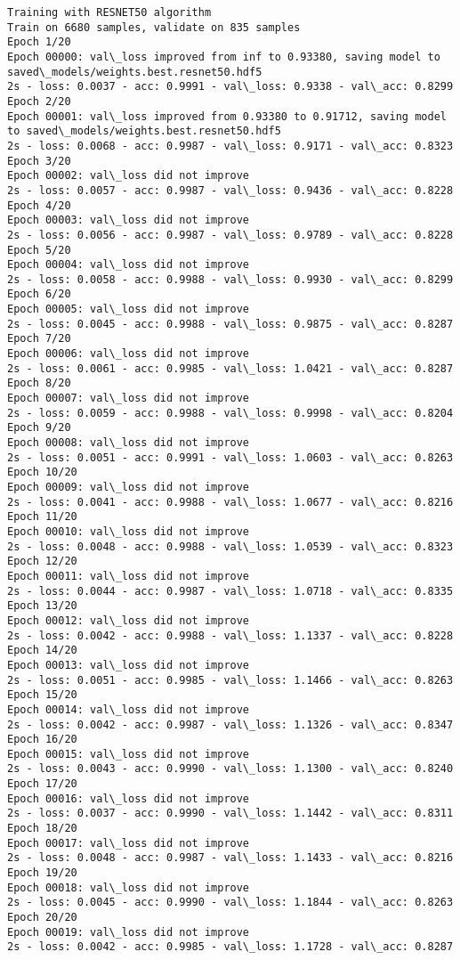 \documentclass[11pt]{article}
\begin{document}
\begin{Verbatim}[commandchars=\\\{\}]
Training with RESNET50 algorithm
Train on 6680 samples, validate on 835 samples
Epoch 1/20
Epoch 00000: val\_loss improved from inf to 0.93380, saving model to saved\_models/weights.best.resnet50.hdf5
2s - loss: 0.0037 - acc: 0.9991 - val\_loss: 0.9338 - val\_acc: 0.8299
Epoch 2/20
Epoch 00001: val\_loss improved from 0.93380 to 0.91712, saving model to saved\_models/weights.best.resnet50.hdf5
2s - loss: 0.0068 - acc: 0.9987 - val\_loss: 0.9171 - val\_acc: 0.8323
Epoch 3/20
Epoch 00002: val\_loss did not improve
2s - loss: 0.0057 - acc: 0.9987 - val\_loss: 0.9436 - val\_acc: 0.8228
Epoch 4/20
Epoch 00003: val\_loss did not improve
2s - loss: 0.0056 - acc: 0.9987 - val\_loss: 0.9789 - val\_acc: 0.8228
Epoch 5/20
Epoch 00004: val\_loss did not improve
2s - loss: 0.0058 - acc: 0.9988 - val\_loss: 0.9930 - val\_acc: 0.8299
Epoch 6/20
Epoch 00005: val\_loss did not improve
2s - loss: 0.0045 - acc: 0.9988 - val\_loss: 0.9875 - val\_acc: 0.8287
Epoch 7/20
Epoch 00006: val\_loss did not improve
2s - loss: 0.0061 - acc: 0.9985 - val\_loss: 1.0421 - val\_acc: 0.8287
Epoch 8/20
Epoch 00007: val\_loss did not improve
2s - loss: 0.0059 - acc: 0.9988 - val\_loss: 0.9998 - val\_acc: 0.8204
Epoch 9/20
Epoch 00008: val\_loss did not improve
2s - loss: 0.0051 - acc: 0.9991 - val\_loss: 1.0603 - val\_acc: 0.8263
Epoch 10/20
Epoch 00009: val\_loss did not improve
2s - loss: 0.0041 - acc: 0.9988 - val\_loss: 1.0677 - val\_acc: 0.8216
Epoch 11/20
Epoch 00010: val\_loss did not improve
2s - loss: 0.0048 - acc: 0.9988 - val\_loss: 1.0539 - val\_acc: 0.8323
Epoch 12/20
Epoch 00011: val\_loss did not improve
2s - loss: 0.0044 - acc: 0.9987 - val\_loss: 1.0718 - val\_acc: 0.8335
Epoch 13/20
Epoch 00012: val\_loss did not improve
2s - loss: 0.0042 - acc: 0.9988 - val\_loss: 1.1337 - val\_acc: 0.8228
Epoch 14/20
Epoch 00013: val\_loss did not improve
2s - loss: 0.0051 - acc: 0.9985 - val\_loss: 1.1466 - val\_acc: 0.8263
Epoch 15/20
Epoch 00014: val\_loss did not improve
2s - loss: 0.0042 - acc: 0.9987 - val\_loss: 1.1326 - val\_acc: 0.8347
Epoch 16/20
Epoch 00015: val\_loss did not improve
2s - loss: 0.0043 - acc: 0.9990 - val\_loss: 1.1300 - val\_acc: 0.8240
Epoch 17/20
Epoch 00016: val\_loss did not improve
2s - loss: 0.0037 - acc: 0.9990 - val\_loss: 1.1442 - val\_acc: 0.8311
Epoch 18/20
Epoch 00017: val\_loss did not improve
2s - loss: 0.0048 - acc: 0.9987 - val\_loss: 1.1433 - val\_acc: 0.8216
Epoch 19/20
Epoch 00018: val\_loss did not improve
2s - loss: 0.0045 - acc: 0.9990 - val\_loss: 1.1844 - val\_acc: 0.8263
Epoch 20/20
Epoch 00019: val\_loss did not improve
2s - loss: 0.0042 - acc: 0.9985 - val\_loss: 1.1728 - val\_acc: 0.8287



\end{Verbatim}
\end{document}

